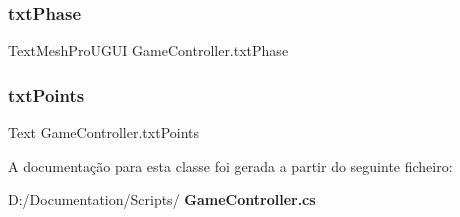 \mbox{\label{class_game_controller_a1a99d8f8eb4cfede9befa73fec24c6d0}} 
\subsubsection{txtPhase}
{\footnotesize\ttfamily Text\+Mesh\+Pro\+U\+G\+UI Game\+Controller.\+txt\+Phase}

\mbox{\label{class_game_controller_aba0be2535315ea391f4b1e099d52791c}} 
\subsubsection{txtPoints}
{\footnotesize\ttfamily Text Game\+Controller.\+txt\+Points}



A documentação para esta classe foi gerada a partir do seguinte ficheiro\+:\begin{DoxyCompactItemize}
\item 
D\+:/\+Documentation/\+Scripts/\textbf{ Game\+Controller.\+cs}\end{DoxyCompactItemize}
